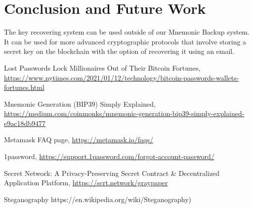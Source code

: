 \documentclass[12pt]{article}
\begin{document}
\section{Conclusion and Future Work}

The key recovering system can be used outside of our Mnemonic Backup system. It can be used for more advanced cryptographic protocols that involve storing a secret key on the blockchain with the option of recovering it using an email. 

\begin{thebibliography}{9}

 Lost Passwords Lock Millionaires Out of Their Bitcoin Fortunes, \url{https://www.nytimes.com/2021/01/12/technology/bitcoin-passwords-wallets-fortunes.html}

 Mnemonic Generation (BIP39) Simply Explained, \url{https://medium.com/coinmonks/mnemonic-generation-bip39-simply-explained-e9ac18db9477}

 Metamask FAQ page, \url{https://metamask.io/faqs/}

 1password, \url{https://support.1password.com/forgot-account-password/}

 Secret Network: A Privacy-Preserving Secret Contract \& Decentralized Application Platform, \url{https://scrt.network/graypaper}

 Steganography https://en.wikipedia.org/wiki/Steganography) 

\end{thebibliography}
\end{document}
